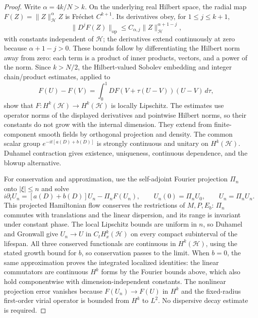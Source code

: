 \begin{proof}
Write $\alpha=4k/N>k$. On the underlying real Hilbert space, the
radial map $F(Z)=\|Z\|_{\mathcal H}^{\alpha}Z$ is Fr\'echet
$C^{k+1}$. Its derivatives obey, for $1\le j\le k+1$,
\[
 \|D^jF(Z)\|_{\mathrm{op}}
 \le C_{\alpha,j}\|Z\|_{\mathcal H}^{\alpha+1-j},
\]
with constants independent of $\mathcal H$; the derivatives extend
continuously at zero because $\alpha+1-j>0$. These bounds follow
by differentiating the Hilbert norm away from zero: each term is a
product of inner products, vectors, and a power of the norm.
Since $k>N/2$, the Hilbert-valued Sobolev embedding and integer
chain/product estimates, applied to
\[
 F(U)-F(V)=\int_0^1 DF(V+\tau(U-V))(U-V)\,d\tau,
\]
show that $F:H^k(\mathcal H)\to H^k(\mathcal H)$ is locally
Lipschitz. The estimates use operator norms of the displayed
derivatives and pointwise Hilbert norms, so their constants do not
grow with the internal dimension. They extend from finite-component
smooth fields by orthogonal projection and density. The common scalar
group $e^{-it[a(D)+b(D)]}$ is strongly continuous and unitary on
$H^k(\mathcal H)$. Duhamel contraction gives existence, uniqueness,
continuous dependence, and the blowup alternative.

For conservation and approximation, use the self-adjoint Fourier
projection $\Pi_n$ onto $|\xi|\le n$ and solve
\[
 i\partial_tU_n=[a(D)+b(D)]U_n-\Pi_nF(U_n),\qquad
 U_n(0)=\Pi_nU_0,\qquad U_n=\Pi_nU_n.
\]
This projected Hamiltonian flow conserves the restrictions of
$M,P,E_b$: $\Pi_n$ commutes with translations and the linear
dispersion, and its range is invariant under constant phase.
The local Lipschitz bounds are uniform in $n$, so Duhamel and
Gronwall give $U_n\to U$ in $C_tH^k_x(\mathcal H)$ on every compact subinterval
of the lifespan. All three conserved functionals are continuous in
$H^k(\mathcal H)$, using the stated growth bound for $b$, so
conservation passes to the limit. When $b=0$, the same approximation
proves the integrated localized identities: the linear commutators
are continuous $H^k$ forms by the Fourier bounds above, which also
hold componentwise with dimension-independent constants. The nonlinear
projection error vanishes because $F(U_n)\to F(U)$ in $H^k$ and
the fixed-radius first-order virial operator is bounded from $H^k$
to $L^2$. No dispersive decay estimate is required.
\end{proof}

